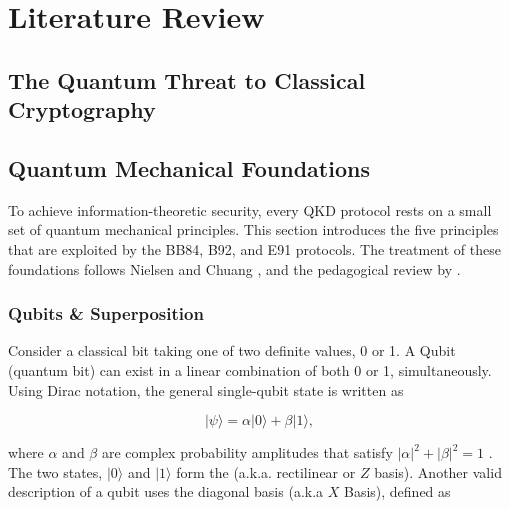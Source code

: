 \documentclass[10pt, a4paper]{report}
\newcommand{\ket}[1]{\ensuremath{|#1\rangle}}
\begin{document}
\chapter{Literature Review}


\section{The Quantum Threat to Classical Cryptography}



\section{Quantum Mechanical Foundations}

To achieve information-theoretic security, every QKD protocol rests on a small set of quantum mechanical principles. This section introduces the five principles that are exploited by the BB84, B92, and E91 protocols. The treatment of these foundations follows Nielsen and Chuang \cite{QKDbible}, and the pedagogical review by \cite{Scarani2009}. 

\subsection{Qubits \& Superposition}
Consider a classical bit taking one of two definite values, 0 or 1. A Qubit (quantum bit) can exist in a linear combination of both 0 or 1, simultaneously. Using Dirac notation, the general single-qubit state is written as

%
\begin{equation}
\label{eq:qubit}
\ket{\psi} = \alpha\ket{0} + \beta\ket{1},
\end{equation}
%

where $\alpha$ and $\beta$ are complex probability amplitudes that satisfy $|\alpha|^{2}+|\beta|^{2}=1$ \cite{QKDbible}. The two states, $\ket{0}$ and $\ket{1}$ form the  (a.k.a. rectilinear or $Z$ basis). Another valid description of a qubit uses the diagonal basis (a.k.a $X$ Basis), defined as
\end{document}
